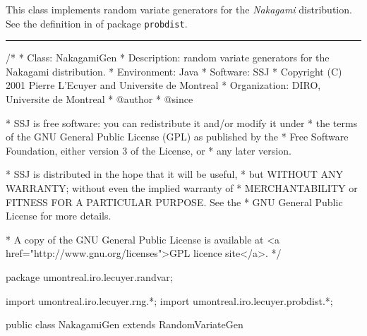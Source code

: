 
This class implements random variate generators for the {\em Nakagami\/} 
distribution. See the definition in 
 of package
\texttt{probdist}.

\bigskip\hrule

\begin{code}
\begin{hide}
/*
 * Class:        NakagamiGen
 * Description:  random variate generators for the Nakagami distribution.
 * Environment:  Java
 * Software:     SSJ 
 * Copyright (C) 2001  Pierre L'Ecuyer and Universite de Montreal
 * Organization: DIRO, Universite de Montreal
 * @author       
 * @since

 * SSJ is free software: you can redistribute it and/or modify it under
 * the terms of the GNU General Public License (GPL) as published by the
 * Free Software Foundation, either version 3 of the License, or
 * any later version.

 * SSJ is distributed in the hope that it will be useful,
 * but WITHOUT ANY WARRANTY; without even the implied warranty of
 * MERCHANTABILITY or FITNESS FOR A PARTICULAR PURPOSE.  See the
 * GNU General Public License for more details.

 * A copy of the GNU General Public License is available at
   <a href="http://www.gnu.org/licenses">GPL licence site</a>.
 */
\end{hide}
package umontreal.iro.lecuyer.randvar;\begin{hide}
import umontreal.iro.lecuyer.rng.*;
import umontreal.iro.lecuyer.probdist.*;
\end{hide}

public class NakagamiGen extends RandomVariateGen \begin{hide} {
   // Distribution parameters
   protected double a;
   protected double lambda;
   protected double c;
\end{hide}
\end{code}

